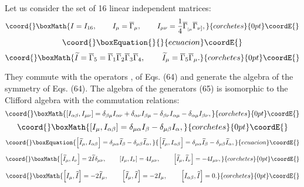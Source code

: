 \documentclass[a4paper,12pt]{article}
\begin{document}
Let us consider the set of 16 linear independent matrices:
\[\coord{}\boxMath{
I=I_{16} ,\hspace{0.3in}I_\mu =\overline{\Gamma }_\mu ,
\hspace{0.3in} I_{\mu \nu }=\frac 14\overline{\Gamma }_{_{[\mu
}}\overline{\Gamma } _{\nu ]} ,
}{corchetes}{0pt}\coordE{}\]
\vspace{-8mm}
\begin{equation}\coord{}\boxEquation{  \label{65}
}{  }{ecuacion}\coordE{}\end{equation}
\vspace{-8mm}
\[\coord{}\boxMath{
\widetilde{I}=\overline{\Gamma }_5=\overline{\Gamma
}_1\overline{\Gamma }_2 \overline{\Gamma }_3\overline{\Gamma }_4 ,
\hspace{0.3in}\widetilde{I} _\mu =\overline{\Gamma
}_5\overline{\Gamma }_\mu .
}{corchetes}{0pt}\coordE{}\]

They commute with the operators \coordHE{}, \coordHE{} of Eqs. (64) and generate the algebra of the
symmetry of Eqs. (64). The algebra of the generators (65) is
isomorphic to the Clifford algebra with the commutation relations:
\[\coord{}\boxMath{
\left[ I_{\alpha \beta },I_{\mu \nu }\right] =\delta _{\beta \mu
}I_{\alpha \nu }+\delta _{\alpha \nu }I_{\beta \mu }-\delta
_{\beta \nu }I_{\alpha \mu }-\delta _{\alpha \mu }I_{\beta \nu } ,
}{corchetes}{0pt}\coordE{}\]
\[\coord{}\boxMath{
\left[ I_\mu ,I_{\alpha \beta }\right] =\delta _{\mu \alpha
}I_\beta -\delta _{\mu \beta }I_\alpha ,
}{corchetes}{0pt}\coordE{}\]
\begin{equation}\coord{}\boxEquation{
\left[ \widetilde{I}_\mu ,I_{\alpha \beta }\right] =\delta _{\mu
\alpha } \widetilde{I}_\beta -\delta _{\mu \beta
}\widetilde{I}_\alpha , \label{66}
}{
\left[ \widetilde{I}_\mu ,I_{\alpha \beta }\right] =\delta _{\mu
\alpha } \widetilde{I}_\beta -\delta _{\mu \beta
}\widetilde{I}_\alpha , }{ecuacion}\coordE{}\end{equation}
\[\coord{}\boxMath{
\left[ \widetilde{I}_\mu ,I_\nu \right] =2\widetilde{I}\delta
_{\mu \nu } ,\hspace{0.3in}\left[ I_\mu ,I_\nu \right] =4I_{\mu
\nu } ,\hspace{0.3in}\left[ \widetilde{I}_\mu ,\widetilde{I}_\nu
\right] =-4I_{\mu \nu } ,
}{corchetes}{0pt}\coordE{}\]
\[\coord{}\boxMath{
\left[ I_\mu ,\widetilde{I}\right] =-2\widetilde{I}_\mu
,\hspace{0.3in}\left[ \widetilde{I}_\mu ,\widetilde{I}\right]
=-2I_\mu  ,\hspace{0.3in}\left[ I_{\alpha \beta
},\widetilde{I}\right] =0 .
}{corchetes}{0pt}\coordE{}\]
\end{document}
